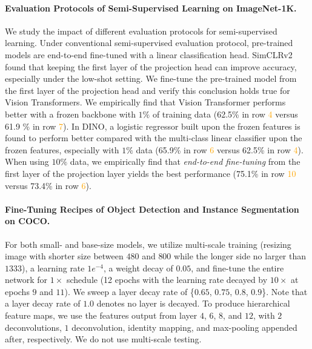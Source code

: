 \documentclass{article} %
\begin{document}
\paragraph{Evaluation Protocols of Semi-Supervised Learning on ImageNet-1K.} 
We study the impact of different evaluation protocols for semi-supervised learning. 
Under conventional semi-supervised evaluation protocol, pre-trained models are end-to-end fine-tuned with a linear classification head. SimCLRv2 \citet{simclrv2} found that keeping the first layer of the projection head can improve accuracy, especially under the low-shot setting. 
We fine-tune the pre-trained model from the first layer of the projection head and verify this conclusion holds true for Vision Transformers. 
We empirically find that Vision Transformer performs better with a frozen backbone with $1\%$ of training data (62.5\% in row \textcolor{orange}{4} versus 61.9
\% in row \textcolor{orange}{7}). 
In DINO, a logistic regressor built upon the frozen features is found to perform better compared with the multi-class linear classifier upon the frozen features, especially with $1\%$ data (65.9\% in row \textcolor{orange}{6} versus 62.5\% in row \textcolor{orange}{4}). 
When using $10\%$ data, we empirically find that \textit{end-to-end fine-tuning} from the first layer of the projection layer yields the best performance (75.1\% in row \textcolor{orange}{10} versus 73.4\% in row \textcolor{orange}{6}). 


\paragraph{Fine-Tuning Recipes of Object Detection and Instance Segmentation on COCO.} 
For both small- and base-size models, we utilize multi-scale training (resizing image with shorter size between $480$ and $800$ while the longer side no larger than $1333$), a learning rate $1e^{-4}$, a weight decay of $0.05$, and fine-tune the entire network for $1\times$ schedule (12 epochs with the learning rate decayed by $10\times$ at epochs $9$ and $11$). 
We sweep a layer decay rate of \{$0.65$, $0.75$, $0.8$, $0.9$\}. Note that a layer decay rate of $1.0$ denotes no layer is decayed.
To produce hierarchical feature maps, we use the features output from layer $4$, $6$, $8$, and $12$, with $2$ deconvolutions, $1$ deconvolution, identity mapping, and max-pooling appended after, respectively. 
We do not use multi-scale testing.
\end{document}
